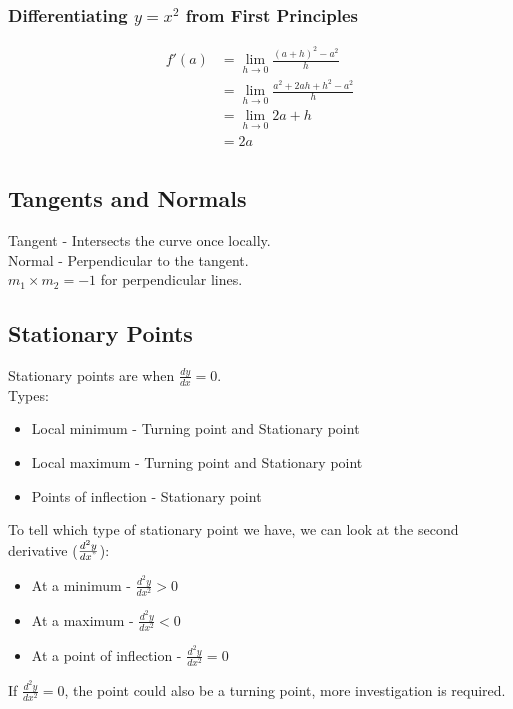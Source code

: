 \documentclass[a4paper,12pt]{article}
\begin{document}
\subsubsection*{Differentiating $y = x^2$ from First Principles}
\begin{align*}
f'(a) & = \lim_{h \to 0} \frac{(a + h)^2 - a^2}{h} \\
& = \lim_{h \to 0} \frac{a^2 + 2ah + h^2 - a^2}{h} \\
& = \lim_{h \to 0} 2a + h \\
& = 2a \\
\end{align*}
\subsection*{Tangents and Normals}
Tangent - Intersects the curve once locally. \\
Normal - Perpendicular to the tangent. \\ 
$m_1 \times m_2 = -1$ for perpendicular lines. \\ 
\subsection*{Stationary Points}
Stationary points are when $\frac{dy}{dx} = 0$. \\
Types:
\begin{itemize}
	\item Local minimum - Turning point and Stationary point
	\item Local maximum - Turning point and Stationary point
	\item Points of inflection - Stationary point
\end{itemize}
To tell which type of stationary point we have, we can look at the second derivative ($\frac{d^2y}{dx^"}$):
\begin{itemize}
	\item At a minimum - $\frac{d^2y}{dx^2} > 0$
	\item At a maximum - $\frac{d^2y}{dx^2} < 0$
	\item At a point of inflection - $\frac{d^2y}{dx^2} = 0$ 
\end{itemize}
If $\frac{d^2y}{dx^2} = 0$, the point could also be a turning point, more investigation is required. 
\end{document}
